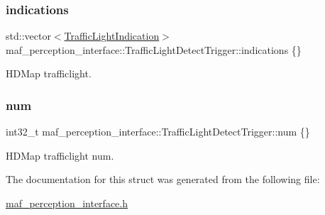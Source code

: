 \subsubsection{\texorpdfstring{indications}{indications}}
{\footnotesize\ttfamily std\+::vector$<$\hyperlink{structmaf__perception__interface_1_1TrafficLightIndication}{Traffic\+Light\+Indication}$>$ maf\+\_\+perception\+\_\+interface\+::\+Traffic\+Light\+Detect\+Trigger\+::indications \{\}}



H\+D\+Map trafficlight. 

\mbox{\label{structmaf__perception__interface_1_1TrafficLightDetectTrigger_aa262f653aaec9d6bcedcbf5ffe8653a2}} 
\subsubsection{\texorpdfstring{num}{num}}
{\footnotesize\ttfamily int32\+\_\+t maf\+\_\+perception\+\_\+interface\+::\+Traffic\+Light\+Detect\+Trigger\+::num \{\}}



H\+D\+Map trafficlight num. 



The documentation for this struct was generated from the following file\+:\begin{DoxyCompactItemize}
\item 
\hyperlink{maf__perception__interface_8h}{maf\+\_\+perception\+\_\+interface.\+h}\end{DoxyCompactItemize}
